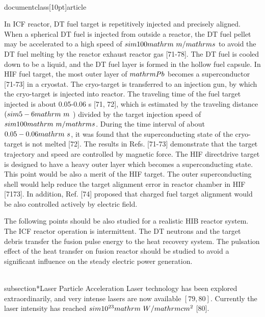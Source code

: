 \\documentclass[10pt]{article}
\begin{document}
{{{{{{In ICF reactor, DT fuel target is repetitively injected and precisely aligned. When a spherical DT fuel is injected from outside a reactor, the DT fuel pellet may be accelerated to a high speed of $\\sim 100 \\mathrm{~m} / \\mathrm{s}$ to avoid the DT fuel melting by the reactor exhaust reactor gas [71-78]. The DT fuel is cooled down to be a liquid, and the DT fuel layer is formed in the hollow fuel capsule. In HIF fuel target, the most outer layer of $\\mathrm{Pb}$ becomes a superconductor [71-73] in a cryostat. The cryo-target is transferred to an injection gun, by which the cryo-target is injected into reactor. The traveling time of the fuel target injected is about 0.05-0.06 s [71, 72], which is estimated by the traveling distance $(\\sim 5-6 \\mathrm{~m}$ ) divided by the target injection speed of $\\sim 100 \\mathrm{~m} / \\mathrm{s}$. During the time interval of about $0.05-0.06 \\mathrm{~s}$, it was found that the superconducting state of the cryo-target is not melted [72]. The results in Refs. [71-73] demonstrate that the target trajectory and speed are controlled by magnetic force. The HIF directdrive target is designed to have a heavy outer layer which becomes a superconducting state. This point would be also a merit of the HIF target. The outer superconducting shell would help reduce the target alignment error in reactor chamber in HIF [7173]. In addition, Ref. [74] proposed that charged fuel target alignment would be also controlled actively by electric field.

The following points should be also studied for a realistic HIB reactor system. The ICF reactor operation is intermittent. The DT neutrons and the target debris transfer the fusion pulse energy to the heat recovery system. The pulsation effect of the heat transfer on fusion reactor should be studied to avoid a significant influence on the steady electric power generation.

\\subsection*{Laser Particle Acceleration}
Laser technology has been explored extraordinarily, and very intense lasers are now available $[79,80]$. Currently the laser intensity has reached $\\sim 10^{23} \\mathrm{~W} / \\mathrm{cm}^{2}$ [80].

}}}}}}
\end{document}
